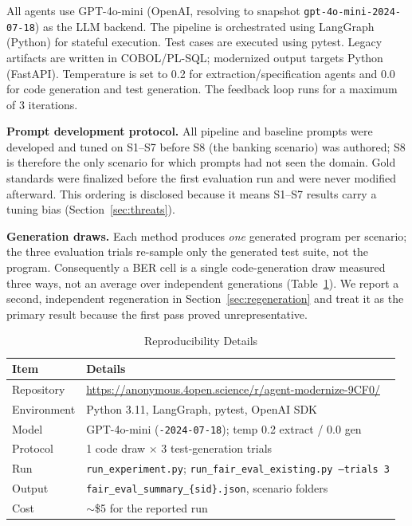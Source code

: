 \documentclass[conference]{IEEEtran}
\begin{document}
All agents use GPT-4o-mini (OpenAI, resolving to snapshot \texttt{gpt-4o-mini-2024-07-18}) as the LLM backend. The pipeline is orchestrated using LangGraph (Python) for stateful execution. Test cases are executed using pytest. Legacy artifacts are written in COBOL/PL-SQL; modernized output targets Python (FastAPI). Temperature is set to 0.2 for extraction/specification agents and 0.0 for code generation and test generation. The feedback loop runs for a maximum of 3 iterations.

\textbf{Prompt development protocol.} All pipeline and baseline prompts were developed and tuned on S1--S7 before S8 (the banking scenario) was authored; S8 is therefore the only scenario for which prompts had not seen the domain. Gold standards were finalized before the first evaluation run and were never modified afterward. This ordering is disclosed because it means S1--S7 results carry a tuning bias (Section~\ref{sec:threats}).

\textbf{Generation draws.} Each method produces \emph{one} generated program per scenario; the three evaluation trials re-sample only the generated test suite, not the program. Consequently a BER cell is a single code-generation draw measured three ways, not an average over independent generations (Table~\ref{tab:reproducibility}). We report a second, independent regeneration in Section~\ref{sec:regeneration} and treat it as the primary result because the first pass proved unrepresentative.

\begin{table}[htbp]
\caption{Reproducibility Details}
\label{tab:reproducibility}
\centering
\footnotesize
\begin{tabular}{@{}lp{5.6cm}@{}}
\toprule
\textbf{Item} & \textbf{Details} \\
\midrule
Repository & \url{https://anonymous.4open.science/r/agent-modernize-9CF0/} \\
Environment & Python 3.11, LangGraph, pytest, OpenAI SDK \\
Model & GPT-4o-mini (\texttt{-2024-07-18}); temp 0.2 extract / 0.0 gen \\
Protocol & 1 code draw $\times$ 3 test-generation trials \\
Run & \texttt{run\_experiment.py}; \texttt{run\_fair\_eval\_existing.py --trials 3} \\
Output & \texttt{fair\_eval\_summary\_\{sid\}.json}, scenario folders \\
Cost & $\sim$\$5 for the reported run \\
\bottomrule
\end{tabular}
\end{table}
\end{document}
